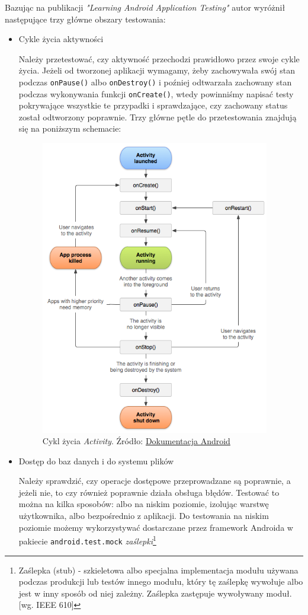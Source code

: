 Bazując na publikacji \textit{"Learning Android Application Testing"\cite{bib:android:testing:learning}} autor wyróżnił następujące trzy główne obszary testowania:

\begin{itemize}
\item{Cykle życia aktywności}

Należy przetestować, czy aktywność przechodzi prawidłowo przez swoje cykle życia. Jeżeli od tworzonej aplikacji wymagamy, żeby zachowywała swój stan podczas \texttt{onPause()} albo \texttt{onDestroy()} i poźniej odtwarzała zachowany stan podczas wykonywania funkcji \texttt{onCreate()}, wtedy powinniśmy napisać testy pokrywające wszystkie te przypadki i sprawdzające, czy zachowany status został odtworzony poprawnie. Trzy główne pętle do przetestowania znajdują się na poniższym schemacie:
\begin{figure}[!htb]
    \centering
    \includegraphics[width=10cm]{imgs/ch2_activity_lifecycle.png}
    \caption{Cykl życia \textit{Activity}. Źródło: \href{http://developer.android.com/reference/android/app/Activity.html}{Dokumentacja Android}}
    \label{fig:sample_figure}
\end{figure} 


\item{Dostęp do baz danych i do systemu plików}

Należy sprawdzić, czy operacje dostępowe przeprowadzane są poprawnie, a jeżeli nie, to czy również poprawnie działa obsługa błędów. Testować to można na kilka sposobów: albo na niskim poziomie, izolując warstwę użytkownika, albo bezpośrednio z aplikacji. Do testowania na niskim poziomie możemy wykorzystywać dostarczane przez framework Androida w pakiecie \texttt{android.test.mock} \textit{zaślepki}\footnote{Zaślepka (stub) - szkieletowa albo specjalna implementacja modułu używana podczas produkcji lub testów innego modułu, który tę zaślepkę wywołuje albo jest w inny sposób od niej zależny. Zaślepka zastępuje wywoływany moduł. [wg. IEEE 610]}


\end{itemize}
